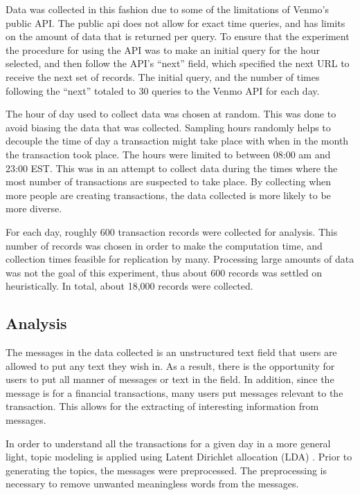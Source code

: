 \documentclass[conference]{IEEEtran}
\begin{document}
Data was collected in this fashion due to some of the limitations of Venmo's public API. The public api does not allow for exact time queries, and has limits on the amount of data that is returned per query. To ensure that the experiment the procedure for using the API was to make an initial query for the hour selected, and then follow the API's ``next'' field, which specified the next URL to receive the next set of records. The initial query, and the number of times following the ``next'' totaled to 30 queries to the Venmo API for each day. 

The hour of day used to collect data was chosen at random. This was done to avoid biasing the data that was collected. Sampling hours randomly helps to decouple the time of day a transaction might take place with when in the month the transaction took place. The hours were limited to between 08:00 am and 23:00 EST. This was in an attempt to collect data during the times where the most number of transactions are suspected to take place. By collecting when more people are creating transactions, the data collected is more likely to be more diverse. 

For each day, roughly 600 transaction records were collected for analysis. This number of records was chosen in order to make the computation time, and collection times feasible for replication by many. Processing large amounts of data was not the goal of this experiment, thus about 600 records was settled on heuristically. In total, about 18,000 records were collected.

\subsection{Analysis}
The messages in the data collected is an unstructured text field that users are allowed to put any text they wish in. As a result, there is the opportunity for users to put all manner of messages or text in the field. In addition, since the message is for a financial transactions, many users put messages relevant to the transaction. This allows for the extracting of interesting information from messages. 

In order to understand all the transactions for a given day in a more general light, topic modeling is applied using Latent Dirichlet allocation (LDA) \cite{LDA}. Prior to generating the topics, the messages were preprocessed. The preprocessing is necessary to remove unwanted meaningless words from the messages.
\end{document}
